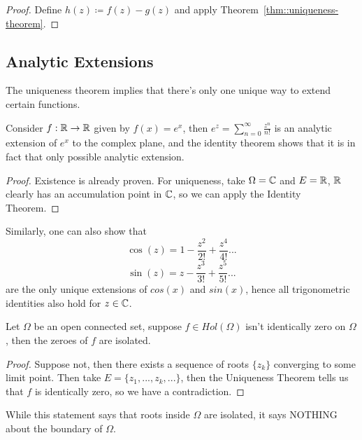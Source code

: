 \begin{proof}
Define $h(z) \coloneqq f(z) - g(z)$ and apply Theorem~\ref{thm::uniqueness-theorem}.
\end{proof}

\subsection{Analytic Extensions}

The uniqueness theorem implies that there's only one unique way to extend certain functions.

\begin{example}
Consider $f: \mathbb{R} \to \mathbb{R}$ given by $f(x) = e^x$, then $e^z = \sum_{n = 0}^\infty \frac{z^n}{n!}$ is an analytic extension of $e^x$ to the complex plane, and the identity theorem shows that it is in fact that only possible analytic extension.
\end{example}

\begin{proof}
Existence is already proven. For uniqueness, take $\Omega = \mathbb{C}$ and $E = \mathbb{R}$, $\mathbb{R}$ clearly has an accumulation point in $\mathbb{C}$, so we can apply the Identity Theorem.
\end{proof}

\begin{example}
Similarly, one can also show that
\[\cos(z) = 1 - \frac{z^2}{2!} + \frac{z^4}{4!} ...\]
\[\sin(z) = z - \frac{z^3}{3!} + \frac{z^5}{5!} ...\]
are the only unique extensions of $cos(x)$ and $sin(x)$, hence all trigonometric identities also hold for $z \in \mathbb{C}$.
\end{example}

\begin{corollary}
Let $\Omega$ be an open connected set, suppose $f \in Hol(\Omega)$ isn't identically zero on $\Omega$, then the zeroes of $f$ are isolated.
\end{corollary}

\begin{proof}
Suppose not, then there exists a sequence of roots $\{z_k\}$ converging to some limit point. Then take $E = \{z_1, ..., z_k, ...\}$, then the Uniqueness Theorem tells us that $f$ is identically zero, so we have a contradiction.
\end{proof}

\begin{remark}
While this statement says that roots inside $\Omega$ are isolated, it says NOTHING about the boundary of $\Omega$.
\end{remark}

